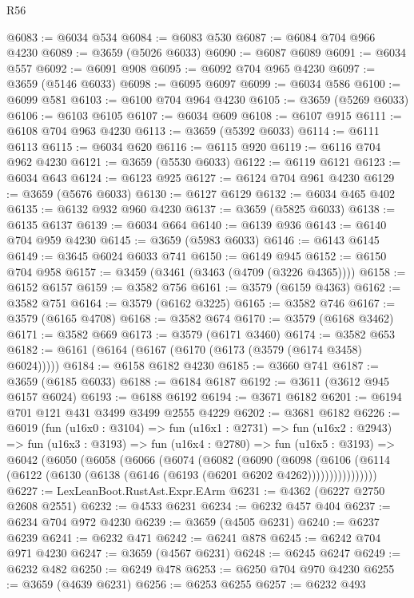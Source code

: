 \begin{lexlean}{R56}
\begin{coremodule}
@6083 := @6034 @534
@6084 := @6083 @530
@6087 := @6084 @704 @966 @4230
@6089 := @3659 (@5026 @6033)
@6090 := @6087 @6089
@6091 := @6034 @557
@6092 := @6091 @908
@6095 := @6092 @704 @965 @4230
@6097 := @3659 (@5146 @6033)
@6098 := @6095 @6097
@6099 := @6034 @586
@6100 := @6099 @581
@6103 := @6100 @704 @964 @4230
@6105 := @3659 (@5269 @6033)
@6106 := @6103 @6105
@6107 := @6034 @609
@6108 := @6107 @915
@6111 := @6108 @704 @963 @4230
@6113 := @3659 (@5392 @6033)
@6114 := @6111 @6113
@6115 := @6034 @620
@6116 := @6115 @920
@6119 := @6116 @704 @962 @4230
@6121 := @3659 (@5530 @6033)
@6122 := @6119 @6121
@6123 := @6034 @643
@6124 := @6123 @925
@6127 := @6124 @704 @961 @4230
@6129 := @3659 (@5676 @6033)
@6130 := @6127 @6129
@6132 := @6034 @465 @402
@6135 := @6132 @932 @960 @4230
@6137 := @3659 (@5825 @6033)
@6138 := @6135 @6137
@6139 := @6034 @664
@6140 := @6139 @936
@6143 := @6140 @704 @959 @4230
@6145 := @3659 (@5983 @6033)
@6146 := @6143 @6145
@6149 := @3645 @6024 @6033 @741
@6150 := @6149 @945
@6152 := @6150 @704 @958
@6157 := @3459 (@3461 (@3463 (@4709 (@3226 @4365))))
@6158 := @6152 @6157
@6159 := @3582 @756
@6161 := @3579 (@6159 @4363)
@6162 := @3582 @751
@6164 := @3579 (@6162 @3225)
@6165 := @3582 @746
@6167 := @3579 (@6165 @4708)
@6168 := @3582 @674
@6170 := @3579 (@6168 @3462)
@6171 := @3582 @669
@6173 := @3579 (@6171 @3460)
@6174 := @3582 @653
@6182 := @6161 (@6164 (@6167 (@6170 (@6173 (@3579 (@6174 @3458) @6024)))))
@6184 := @6158 @6182 @4230
@6185 := @3660 @741
@6187 := @3659 (@6185 @6033)
@6188 := @6184 @6187
@6192 := @3611 (@3612 @945 @6157 @6024)
@6193 := @6188 @6192
@6194 := @3671 @6182
@6201 := @6194 @701 @121 @431 @3499 @3499 @2555 @4229
@6202 := @3681 @6182
@6226 := @6019
    (fun (u16x0 : @3104) =>
    fun (u16x1 : @2731) =>
    fun (u16x2 : @2943) =>
    fun (u16x3 : @3193) =>
    fun (u16x4 : @2780) =>
    fun (u16x5 : @3193) =>
    @6042
      (@6050
        (@6058
          (@6066
            (@6074
              (@6082
                (@6090
                  (@6098
                    (@6106
                      (@6114 (@6122 (@6130 (@6138 (@6146 (@6193 (@6201 @6202 @4262))))))))))))))))
@6227 := LexLeanBoot.RustAst.Expr.EArm
@6231 := @4362 (@6227 @2750 @2608 @2551)
@6232 := @4533 @6231
@6234 := @6232 @457 @404
@6237 := @6234 @704 @972 @4230
@6239 := @3659 (@4505 @6231)
@6240 := @6237 @6239
@6241 := @6232 @471
@6242 := @6241 @878
@6245 := @6242 @704 @971 @4230
@6247 := @3659 (@4567 @6231)
@6248 := @6245 @6247
@6249 := @6232 @482
@6250 := @6249 @478
@6253 := @6250 @704 @970 @4230
@6255 := @3659 (@4639 @6231)
@6256 := @6253 @6255
@6257 := @6232 @493

\end{coremodule}
\end{lexlean}
